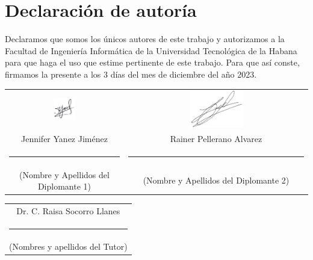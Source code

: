 \section*{Declaración de autoría}

Declaramos que somos los únicos autores de este trabajo y autorizamos a la Facultad de Ingeniería Informática de la Universidad Tecnológica de la Habana para que haga el uso que estime pertinente de este trabajo. Para que así conste, firmamos la presente a los 3 días del mes de diciembre del año 2023.


\vspace{1cm}

\begingroup	

\setlength{\tabcolsep}{30pt} %
\renewcommand{\arraystretch}{0.5} %
\hspace{-1.5cm}
\begin{tabular}{c c}
	
	\includegraphics[width=0.2\textwidth]{figuras/firmas/firma jenny.png}
	& \includegraphics[width=0.3\textwidth]{figuras/firmas/firma ray.png}\\
	Jennifer Yanez Jiménez  & Rainer Pellerano Alvarez \\
	\noindent\rule{6cm}{0.4pt} & \noindent\rule{6cm}{0.4pt} \\ \addlinespace[8pt]
	(Nombre y Apellidos del Diplomante 1) &  		(Nombre y Apellidos del Diplomante 2) 
\end{tabular}
\vspace{5cm}

\hspace{-1.3cm}
\centering
\begin{tabular}{c}
	Dr. C. Raisa Socorro Llanes  \\
	\noindent\rule{6cm}{0.4pt} \\ \addlinespace[8pt]
	(Nombres y apellidos del Tutor) 
\end{tabular}

\endgroup